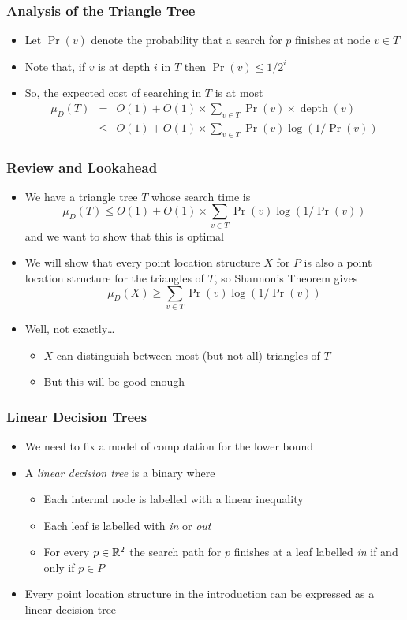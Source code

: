 \documentclass{beamer}
\DeclareMathOperator{\depth}{depth}
\begin{document}
\frame
{
   \frametitle{Analysis of the Triangle Tree}
   \begin{itemize}
   \item<1-> Let $\Pr(v)$ denote the probability that a search for $p$ 
	finishes at node $v\in T$
   \item<2-> Note that, if $v$ is at depth $i$ in $T$ then $\Pr(v)\le 1/2^i$
   \item<3-> So, the expected cost of searching in $T$ is at most
   \begin{eqnarray*}
      \mu_D(T) 
    &=& O(1) + O(1)\times\sum_{v\in T} \Pr(v)\times\depth(v) \\
       &\le& O(1)+O(1)\times \sum_{v\in T} \Pr(v)\log(1/\Pr(v))
   \end{eqnarray*}
   \end{itemize}

}

\frame
{
	\frametitle{Review and Lookahead}
	\begin{itemize}
	\item<1-> We have a triangle tree $T$ whose search time is
	 \[ \mu_D(T) \le O(1)+O(1)\times \sum_{v\in T} \Pr(v)\log(1/\Pr(v))
         \]
	and we want to show that this is optimal 
        \item<2-> We will show that every point location structure $X$ for
	$P$ is also a point location structure for the triangles of
$T$, so Shannon's Theorem gives
	 \[ \mu_D(X) \ge \sum_{v\in T} \Pr(v)\log(1/\Pr(v))
         \]
        \item<3-> Well, not exactly\ldots
          \begin{itemize}
		\item<4-> $X$ can distinguish between most (but not all) triangles of $T$
		\item<5-> But this will be good enough
          \end{itemize}
	\end{itemize}
}

\frame
{
   \frametitle{Linear Decision Trees}
   \begin{itemize}
     \item<1-> We need to fix a model of computation for the lower bound
     \item<2-> A \emph{linear decision tree} is a binary where
       \begin{itemize}
          \item Each internal node is labelled with a linear inequality
          \item Each leaf is labelled with \emph{in} or \emph{out}
          \item For every $p\in\mathbb{R}^2$ the search path for $p$ finishes at 
           a leaf labelled \emph{in} if and only if $p\in P$
       \end{itemize}
     \item<3-> Every point location structure in the
	introduction can be expressed as a linear decision tree
   \end{itemize}
}
\end{document}
